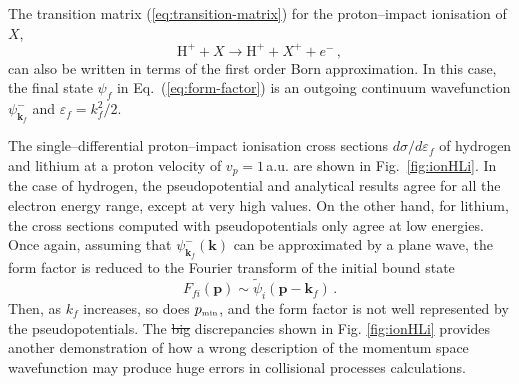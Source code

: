 \documentclass[10pt]{article}
\providecommand{\DIFaddtex}[1]{{\protect\color{blue}\uwave{#1}}} %
\providecommand{\DIFdeltex}[1]{{\protect\color{red}\sout{#1}}}                      %
\providecommand{\DIFaddbegin}{} %
\providecommand{\DIFaddend}{} %
\providecommand{\DIFdelbegin}{} %
\providecommand{\DIFdelend}{} %
\providecommand{\DIFadd}[1]{\texorpdfstring{\DIFaddtex{#1}}{#1}} %
\providecommand{\DIFdel}[1]{\texorpdfstring{\DIFdeltex{#1}}{}} %
\begin{document}
The transition matrix (\ref{eq:transition-matrix}) for the 
proton--impact ionisation of $X$,
\begin{equation}
 \mbox{H}^+ + X \rightarrow \mbox{H}^+ + X^+ + e^-\,,
\end{equation}
can also be written in terms of the first order Born
approximation. In this case, the final state $\psi_{\!f}$ in 
Eq.~(\ref{eq:form-factor}) is an outgoing continuum 
wavefunction $\psi_{\mathbf{k}_{\!f}}^-$ and $\varepsilon_{\!f}=k_{\!f}^2/2$. 

The single--differential proton--impact ionisation cross sections 
$d\sigma/d\varepsilon_{\!f}$ of hydrogen and lithium at a proton 
velocity of $v_p=1$\,a.u. 
are shown in Fig.~\ref{fig:ionHLi}. 
In the case of hydrogen, the pseudopotential and analytical results
agree for all the electron energy range, except at very high values. 
On the other hand, for lithium, the cross sections computed with 
pseudopotentials only agree at low energies. 
Once again, assuming that $\psi_{\mathbf{k}_{\!f}}^-(\mathbf{k})$ can be 
approximated by a plane wave, the form factor is reduced to the 
Fourier transform of the initial bound state
\begin{equation}
 F_{\!fi}(\mathbf{p})\sim\widetilde{\psi}_i(\mathbf{p}-\mathbf{k}_{\!f})\,.
\end{equation}
Then, as $k_{\!f}$ increases, so does $p_{\mbox{\tiny min}}$, and the form
factor is not well represented by the pseudopotentials. The \DIFdelbegin \DIFdel{big 
}\DIFdelend \DIFaddbegin \DIFadd{significant 
}\DIFaddend discrepancies shown in Fig. \ref{fig:ionHLi} provides another demonstration
of how a wrong description of the momentum space wavefunction may
produce huge errors in collisional processes calculations.
\end{document}
